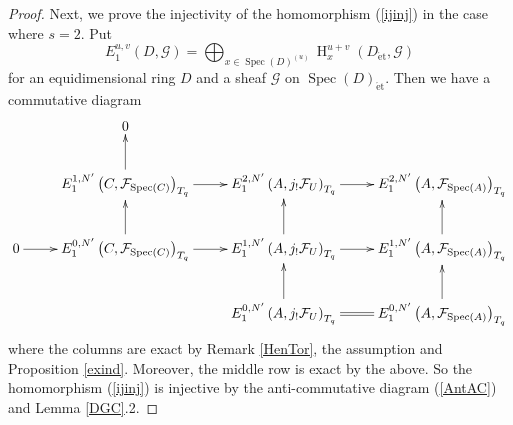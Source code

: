 \documentclass{article}
\newcommand{\spec}{\operatorname{Spec}}
\newcommand{\et}{\mathrm{\acute{e}t}}
\newcommand{\HO}{\operatorname{H}}
\begin{document}
\begin{proof}
Next, 
we prove the injectivity of the homomorphism (\ref{ijinj})
in the case where $s=2$. 
Put
%
\begin{equation*}
E^{u, v}_{1}(D, \mathcal{G})
=
\displaystyle\bigoplus_{x\in \spec(D)^{(u)}}
\HO^{u+v}_{x}(
D_{\et},
\mathcal{G}
)
\end{equation*}
%
for an equidimensional ring $D$ and 
a sheaf $\mathcal{G}$ on $\spec(D)_{\et}$.
Then we have a commutative diagram
%
\footnotesize
\begin{equation*}
\xymatrix{
&0 \\
&
E^{1, N^{\prime}}_{1}\left(
C,
\mathcal{F}_{\spec(C)}
\right)_{T_{q}}
\ar[u]\ar[r]
&
E^{2, N^{\prime}}_{1}\left(
A,
j_{!}\mathcal{F}_{U}
\right)_{T_{q}}
\ar[r]
&
E^{2, N^{\prime}}_{1}\left(
A,
\mathcal{F}_{\spec(A)}
\right)_{T_{q}}
\\
0\ar[r]
&
E^{0, N^{\prime}}_{1}\left(
C,
\mathcal{F}_{\spec(C)}
\right)_{T_{q}}
\ar[r]\ar[u]
&
E^{1, N^{\prime}}_{1}\left(
A,
j_{!}\mathcal{F}_{U}
\right)_{T_{q}}
\ar[r]\ar[u]
&
E^{1, N^{\prime}}_{1}\left(
A,
\mathcal{F}_{\spec(A)}
\right)_{T_{q}}
\ar[u]  \\
&
&
E^{0, N^{\prime}}_{1}\left(
A,
j_{!}\mathcal{F}_{U}
\right)_{T_{q}}
\ar[u]\ar@{=}[r]
&
E^{0, N^{\prime}}_{1}\left(
A,
\mathcal{F}_{\spec(A)}
\right)_{T_{q}}
\ar[u]
}    
\end{equation*}
\normalsize
%
where the columns are exact by 
Remark \ref{HenTor}, the assumption and Proposition \ref{exind}.
Moreover, the middle row is exact by the above.
So the homomorphism (\ref{ijinj}) is injective by the anti-commutative diagram (\ref{AntAC}) 
and Lemma 
\ref{DGC}.2.


\end{proof}
\end{document}
